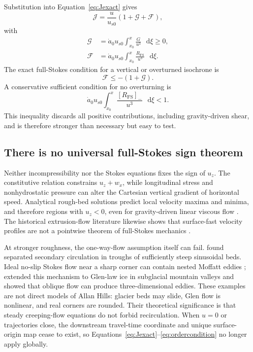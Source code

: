 \documentclass[review]{igs}
\newcommand{\parencite}{\citep}
\newcommand{\textcite}{\citet}
\theoremstyle{definition}
\theoremstyle{remark}
\newcommand{\dd}{\mathop{}\!\mathrm{d}}
\newcommand{\Jord}{\mathcal{J}}
\newcommand{\Ggrav}{\mathcal{G}}
\newcommand{\Gfs}{\mathcal{F}}
\newcommand{\negpart}[1]{\left[#1\right]_{-}}
\begin{document}
Substitution into Equation~\eqref{eq:Jexact} gives
\begin{equation}
\Jord=\frac{u}{u_{s0}}
\left(1+\Ggrav+\Gfs\right),
\label{eq:Jfullstokes}
\end{equation}
with
\begin{align}
\Ggrav&=\dot a_0u_{s0}
\int_{x_0}^{x}\frac{G}{u^3}\,\dd\xi\geq0,
\label{eq:Ggrav}\\
\Gfs&=\dot a_0u_{s0}
\int_{x_0}^{x}\frac{R_{\mathrm{FS}}}{u^3}\,\dd\xi.
\label{eq:Gfs}
\end{align}
The exact full-Stokes condition for a vertical or overturned isochrone is
\begin{equation}
\boxed{
\Gfs\leq-\left(1+\Ggrav\right).
}
\label{eq:FSfailure}
\end{equation}
A conservative sufficient condition for no overturning is
\begin{equation}
\boxed{
\dot a_0u_{s0}
\int_{x_0}^{x}
\frac{\negpart{R_{\mathrm{FS}}}}{u^3}\,\dd\xi<1.
}
\label{eq:FSsufficient}
\end{equation}
This inequality discards all positive contributions, including gravity-driven shear, and is therefore stronger than necessary but easy to test.

\subsection{There is no universal full-Stokes sign theorem}

Neither incompressibility nor the Stokes equations fixes the sign of \(u_z\). The constitutive relation constrains \(u_z+w_x\), while longitudinal stress and nonhydrostatic pressure can alter the Cartesian vertical gradient of horizontal speed. Analytical rough-bed solutions predict local velocity maxima and minima, and therefore regions with \(u_z<0\), even for gravity-driven linear viscous flow \parencite{Gudmundsson1997linear}. The historical extrusion-flow literature likewise shows that surface-fast velocity profiles are not a pointwise theorem of full-Stokes mechanics \parencite{Waddington2010}.

At stronger roughness, the one-way-flow assumption itself can fail. \textcite{Gudmundsson1997nonlinear} found separated secondary circulation in troughs of sufficiently steep sinusoidal beds. Ideal no-slip Stokes flow near a sharp corner can contain nested Moffatt eddies \parencite{Moffatt1964}; \textcite{MeyerCreyts2017} extended this mechanism to Glen-law ice in subglacial mountain valleys and showed that oblique flow can produce three-dimensional eddies. These examples are not direct models of Allan Hills: glacier beds may slide, Glen flow is nonlinear, and real corners are rounded. Their theoretical significance is that steady creeping-flow equations do not forbid recirculation. When \(u=0\) or trajectories close, the downstream travel-time coordinate and unique surface-origin map cease to exist, so Equations~\eqref{eq:Jexact}--\eqref{eq:ordercondition} no longer apply globally.
\end{document}
